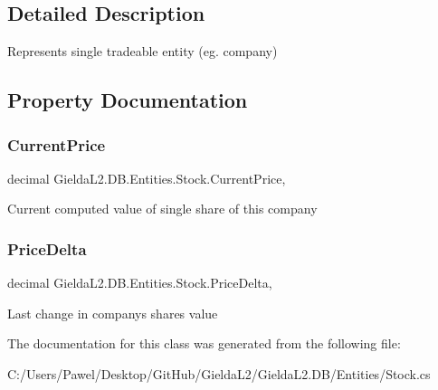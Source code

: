 \subsection{Detailed Description}
Represents single tradeable entity (eg. company) 



\subsection{Property Documentation}
\mbox{\label{class_gielda_l2_1_1_d_b_1_1_entities_1_1_stock_a6f7d6e47c44e70138e95c1aa21bde708}} 
\subsubsection{\texorpdfstring{CurrentPrice}{CurrentPrice}}
{\footnotesize\ttfamily decimal Gielda\+L2.\+D\+B.\+Entities.\+Stock.\+Current\+Price\hspace{0.3cm}{\ttfamily [get]}, {\ttfamily [set]}}



Current computed value of single share of this company 

\mbox{\label{class_gielda_l2_1_1_d_b_1_1_entities_1_1_stock_a81e7483e621a4c6baada66f707ab0c71}} 
\subsubsection{\texorpdfstring{PriceDelta}{PriceDelta}}
{\footnotesize\ttfamily decimal Gielda\+L2.\+D\+B.\+Entities.\+Stock.\+Price\+Delta\hspace{0.3cm}{\ttfamily [get]}, {\ttfamily [set]}}



Last change in company\textquotesingle{}s shares value 



The documentation for this class was generated from the following file\+:\begin{DoxyCompactItemize}
\item 
C\+:/\+Users/\+Pawel/\+Desktop/\+Git\+Hub/\+Gielda\+L2/\+Gielda\+L2.\+D\+B/\+Entities/Stock.\+cs\end{DoxyCompactItemize}
